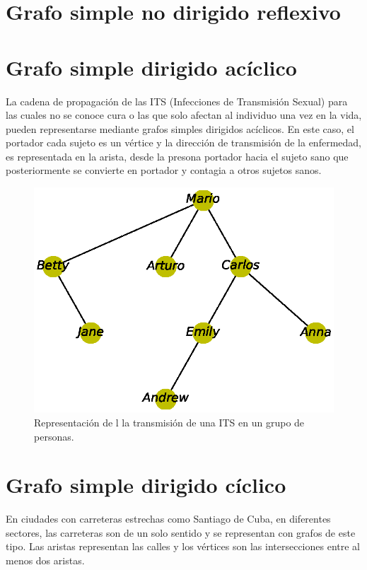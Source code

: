 \documentclass{article}
\begin{document}
\section{Grafo simple no dirigido reflexivo}



\section{Grafo simple dirigido acíclico}

La cadena de propagación de las ITS (Infecciones de Transmisión Sexual) para las cuales no se conoce cura o las que solo afectan al individuo una vez en la vida, pueden representarse mediante grafos simples dirigidos acíclicos. En este caso, el portador cada sujeto es un vértice y la dirección de transmisión de la enfermedad, es representada en la arista, desde la presona portador hacia el sujeto sano que posteriormente se convierte en portador y contagia a otros sujetos sanos.


\begin{figure}
  \includegraphics[width=.8\columnwidth]{4.eps}
  \caption{Representación de l la transmisión de una ITS en un grupo de personas.}
  \label{fig:4}
\end{figure}

\section{Grafo simple dirigido cíclico}

En ciudades con carreteras estrechas como Santiago de Cuba, en diferentes sectores, las carreteras son de un solo sentido y se representan con grafos de este tipo. Las aristas representan las calles y los vértices son las intersecciones entre al menos dos aristas.
\end{document}
